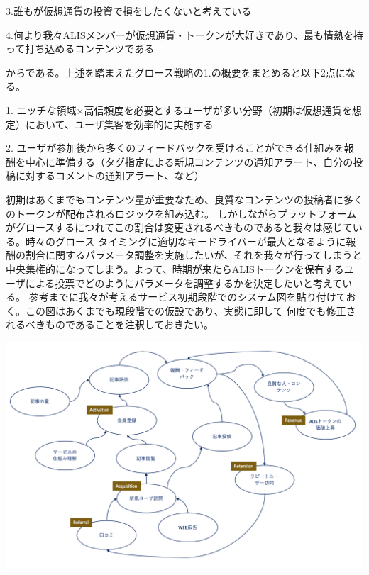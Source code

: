 \documentclass{jsarticle}
\begin{document}
3.誰もが仮想通貨の投資で損をしたくないと考えている

4.何より我々ALISメンバーが仮想通貨・トークンが大好きであり、最も情熱を持って打ち込めるコンテンツである

からである。上述を踏まえたグロース戦略の1.の概要をまとめると以下2点になる。

1. ニッチな領域×高信頼度を必要とするユーザが多い分野（初期は仮想通貨を想定）において、ユーザ集客を効率的に実施する

2. ユーザが参加後から多くのフィードバックを受けることができる仕組みを報酬を中心に準備する（タグ指定による新規コンテンツの通知アラート、自分の投稿に対するコメントの通知アラート、など）

初期はあくまでもコンテンツ量が重要なため、良質なコンテンツの投稿者に多くのトークンが配布されるロジックを組み込む。
しかしながらプラットフォームがグロースするにつれてこの割合は変更されるべきものであると我々は感じている。時々のグロース
タイミングに適切なキードライバーが最大となるように報酬の割合に関するパラメータ調整を実施したいが、それを我々が行ってしまうと
中央集権的になってしまう。よって、時期が来たらALISトークンを保有するユーザによる投票でどのようにパラメータを調整するかを決定したいと考えている。
参考までに我々が考えるサービス初期段階でのシステム図を貼り付けておく。この図はあくまでも現段階での仮設であり、実態に即して
何度でも修正されるべきものであることを注釈しておきたい。

\begin{center}
	\includegraphics[scale=0.6]{img/systemthinking-with-AARRR.png}
\end{center}
\end{document}

